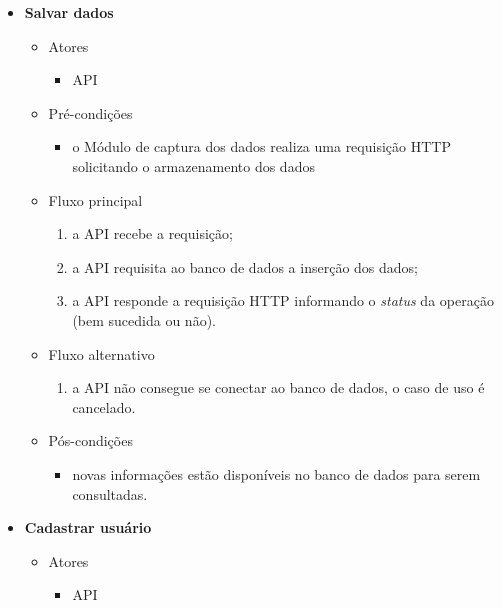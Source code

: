 \begin{itemize}


	\item \textbf{Salvar dados}

		\begin{itemize}
		    \item Atores
			    \begin{itemize}
			        \item API
			    \end{itemize}

		    \item Pré-condições
			    \begin{itemize}
			        \item o Módulo de captura dos dados realiza uma requisição HTTP solicitando o armazenamento dos dados
			    \end{itemize}

		    \item Fluxo principal
			    \begin{enumerate}
			        \item a API recebe a requisição;
			        \item a API requisita ao banco de dados a inserção dos dados;
        			\item a API responde a requisição HTTP informando o \textit{status} da operação (bem sucedida ou não).
			    \end{enumerate}
    
		    \item Fluxo alternativo
			    \begin{enumerate}
			        \item a API não consegue se conectar ao banco de dados, o caso de uso é cancelado.
			    \end{enumerate}
	
		    \item Pós-condições
			    \begin{itemize}
			       \item novas informações estão disponíveis no banco de dados para serem consultadas.
			    \end{itemize}
		\end{itemize}
		
		
	\item \textbf{Cadastrar usuário}

		\begin{itemize}
		    \item Atores
			    \begin{itemize}
			        \item API
			    \end{itemize}


\end{itemize}
\end{itemize}
